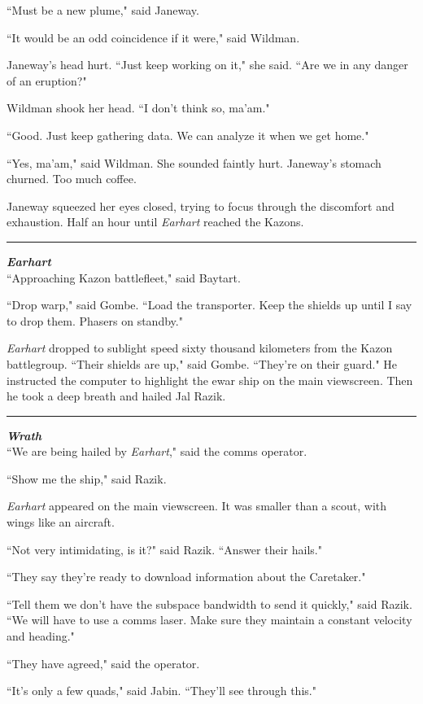 \documentclass[twoside,letterpaper,12pt]{memoir}
\begin{document}
``Must be a new plume," said Janeway.

``It would be an odd coincidence if it were," said Wildman.

Janeway's head hurt. ``Just keep working on it," she said. ``Are we in any danger of an eruption?"

Wildman shook her head. ``I don't think so, ma'am."

``Good. Just keep gathering data. We can analyze it when we get home."

``Yes, ma'am," said Wildman. She sounded faintly hurt. Janeway's stomach churned. Too much coffee.

Janeway squeezed her eyes closed, trying to focus through the discomfort and exhaustion. Half an hour until \textit{Earhart} reached the Kazons.

\fancybreak{\rule{3cm}{0.4 pt}}
\noindent\textit{\textbf{Earhart}}\\

``Approaching Kazon battlefleet," said Baytart.

``Drop warp," said Gombe. ``Load the transporter. Keep the shields up until I say to drop them. Phasers on standby."

\textit{Earhart} dropped to sublight speed sixty thousand kilometers from the Kazon battlegroup. ``Their shields are up," said Gombe. ``They're on their guard." He instructed the computer to highlight the ewar ship on the main viewscreen. Then he took a deep breath and hailed Jal Razik.

\fancybreak{\rule{3cm}{0.4 pt}}
\noindent\textit{\textbf{Wrath}}\\

``We are being hailed by \textit{Earhart}," said the comms operator.

``Show me the ship," said Razik.

\textit{Earhart} appeared on the main viewscreen. It was smaller than a scout, with wings like an aircraft.

``Not very intimidating, is it?" said Razik. ``Answer their hails."

``They say they're ready to download information about the Caretaker."

``Tell them we don't have the subspace bandwidth to send it quickly," said Razik. ``We will have to use a comms laser. Make sure they maintain a constant velocity and heading."

``They have agreed," said the operator.

``It's only a few quads," said Jabin. ``They'll see through this."
\end{document}
